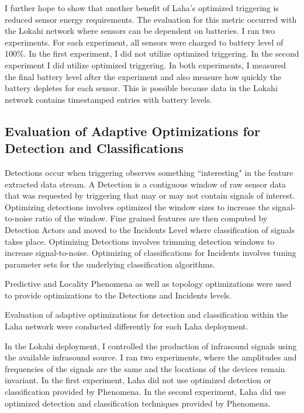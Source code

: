 I further hope to show that another benefit of Laha's optimized triggering is reduced sensor energy requirements. The evaluation for this metric occurred with the Lokahi network where sensors can be dependent on batteries. I ran two experiments. For each experiment, all sensors were charged to battery level of 100\%. In the first experiment, I did not utilize optimized triggering. In the second experiment I did utilize optimized triggering. In both experiments, I measured the final battery level after the experiment and also measure how quickly the battery depletes for each sensor. This is possible because data in the Lokahi network contains timestamped entries with battery levels.

\subsection{Evaluation of Adaptive Optimizations for Detection and Classifications}\label{subsec:evaluation-of-adaptive-optimizations-for-detection-and-classifications}
Detections occur when triggering observes something ``interesting" in the feature extracted data stream. A Detection is a contiguous window of raw sensor data that was requested by triggering that may or may not contain signals of interest. Optimizing detections involves optimized the window sizes to increase the signal-to-noise ratio of the window. Fine grained features are then computed by Detection Actors and moved to the Incidents Level where classification of signals takes place. Optimizing Detections involves trimming detection windows to increase signal-to-noise. Optimizing of classifications for Incidents involves tuning parameter sets for the underlying classification algorithms.

Predictive and Locality Phenomena as well as topology optimizations were used to provide optimizations to the Detections and Incidents levels.

Evaluation of adaptive optimizations for detection and classification within the Laha network were conducted differently for each Laha deployment.

In the Lokahi deployment, I controlled the production of infrasound signals using the available infrasound source. I ran two experiments, where the amplitudes and frequencies of the signals are the same and the locations of the devices remain invariant. In the first experiment, Laha did not use optimized detection or classification provided by Phenomena. In the second experiment, Laha did use optimized detection and classification techniques provided by Phenomena.

